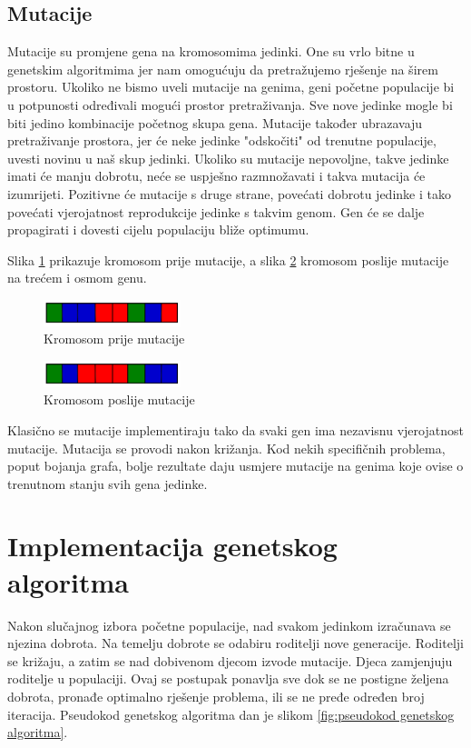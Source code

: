 \documentclass[times, utf8, zavrsni]{fer}
\begin{document}
\subsection{Mutacije}
Mutacije su promjene gena na kromosomima jedinki. One su vrlo bitne u genetskim algoritmima jer nam omogućuju da pretražujemo rješenje na širem prostoru. Ukoliko ne bismo uveli mutacije na genima, geni početne populacije bi u potpunosti određivali mogući prostor pretraživanja. Sve nove jedinke mogle bi biti jedino kombinacije početnog skupa gena. Mutacije također ubrazavaju pretraživanje prostora, jer će neke jedinke "odskočiti" od trenutne populacije, uvesti novinu u naš skup jedinki. Ukoliko su mutacije nepovoljne, takve jedinke imati će manju dobrotu, neće se uspješno razmnožavati i takva mutacija će izumrijeti. Pozitivne će mutacije s druge strane, povećati dobrotu jedinke i tako povećati vjerojatnost reprodukcije jedinke s takvim genom. Gen će se dalje propagirati i dovesti cijelu populaciju bliže optimumu.

Slika \ref{fig:kromosom prije mutacije} prikazuje kromosom prije mutacije, a slika \ref{fig:kromosom poslije mutacije} kromosom poslije mutacije na trećem i osmom genu.

\begin{figure}[htb]
\centering
\includegraphics[width=4cm]{images/prije_mutacije.png}
\caption{Kromosom prije mutacije}
\label{fig:kromosom prije mutacije}
\end{figure}

\begin{figure}[htb]
\centering
\includegraphics[width=4cm]{images/poslije_mutacije.png}
\caption{Kromosom poslije mutacije}
\label{fig:kromosom poslije mutacije}
\end{figure}

Klasično se mutacije implementiraju tako da svaki gen ima nezavisnu vjerojatnost mutacije. Mutacija se provodi nakon križanja. Kod nekih specifičnih problema, poput bojanja grafa, bolje rezultate daju usmjere mutacije na genima koje ovise o trenutnom stanju svih gena jedinke.

\section{Implementacija genetskog algoritma}
Nakon slučajnog izbora početne populacije, nad svakom jedinkom izračunava se njezina dobrota. Na temelju dobrote se odabiru roditelji nove generacije. Roditelji se križaju, a zatim se nad dobivenom djecom izvode mutacije. Djeca zamjenjuju roditelje u populaciji. Ovaj se postupak ponavlja sve dok se ne postigne željena dobrota, pronađe optimalno rješenje problema, ili se ne pređe određen broj iteracija. Pseudokod genetskog algoritma dan je slikom \ref{fig:pseudokod genetskog algoritma}.
\end{document}
